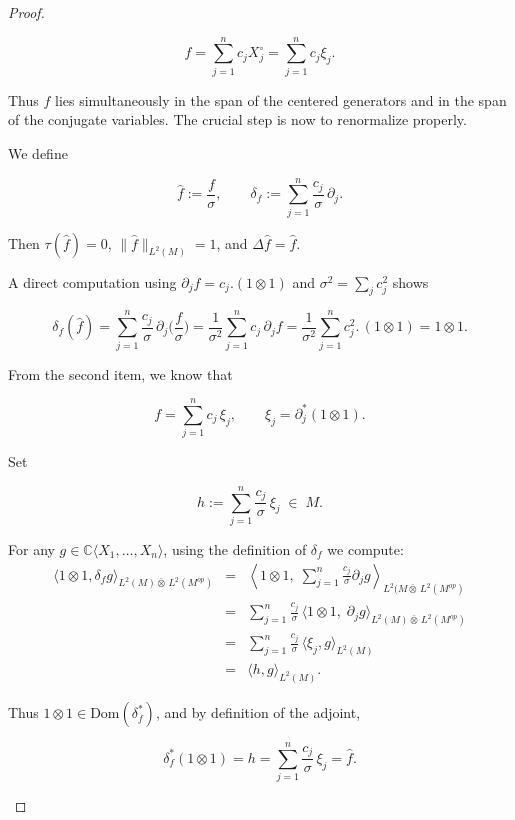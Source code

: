 \documentclass[10pt,a4paper,reqno]{amsart}
\newcommand{\A}{\mathbb{C}\langle X_1,\dots,X_n\rangle}
\begin{document}
\begin{proof}
\begin{enumerate}
\[
      f=\sum_{j=1}^n c_j X_j^\circ=\sum_{j=1}^n c_j \xi_j.
  \]


  Thus $f$ lies simultaneously in the span of the centered generators and in the span of the conjugate variables.  
  The crucial step is now to renormalize properly.

  \medskip
  We define
  

\[
      \widehat{f}:=\frac{f}{\sigma},\qquad 
      \delta_f:=\sum_{j=1}^n \frac{c_j}{\sigma}\,\partial_j.
  \]


  Then $\tau(\widehat f)=0$, $\|\widehat f\|_{L^2(M)}=1$, and $\Delta\widehat f=\widehat f$.

  A direct computation using $\partial_j f = c_j.(1\otimes 1)$ and $\sigma^2=\sum_j c_j^2$ shows
  

\[
      \delta_f(\widehat{f})
      =
      \sum_{j=1}^n \frac{c_j}{\sigma}\,\partial_j\Big(\frac{f}{\sigma}\Big)
      =
      \frac{1}{\sigma^2}\sum_{j=1}^n c_j\,\partial_j f
      =
      \frac{1}{\sigma^2}\sum_{j=1}^n c_j^2.\,(1\otimes 1)
      =
      1\otimes 1.
  \]



  \medskip
  From the second item, we know that
  

\[
      f=\sum_{j=1}^n c_j\,\xi_j,
      \qquad 
      \xi_j=\partial_j^\ast(1\otimes 1).
  \]


  Set
  

\[
      h:=\sum_{j=1}^n \frac{c_j}{\sigma}\,\xi_j \;\in\; M.
  \]



  For any $g\in\A$, using the definition of $\delta_f$ we compute:
  \begin{eqnarray*}
      \big\langle 1\otimes 1,\delta_f g\big\rangle_{L^2(M)\bar\otimes\,L^2(M^{op})}
      &=& \left\langle 1\otimes 1,\;
         \sum_{j=1}^n \frac{c_j}{\sigma}\partial_j g
         \right\rangle_{L^2(M\bar\otimes\,L^2(M^{op})} \\
      &=& \sum_{j=1}^n \frac{c_j}{\sigma}\,
         \big\langle 1\otimes 1,\;\partial_j g\big\rangle_{L^2(M)\bar\otimes\,L^2(M^{op})} \\
      &=& \sum_{j=1}^n \frac{c_j}{\sigma}\,
         \big\langle \xi_j,g\big\rangle_{L^2(M)} \\
      &=& \big\langle h,g\big\rangle_{L^2(M)}.
  \end{eqnarray*}

  Thus $1\otimes 1\in\mathrm{Dom}(\delta_f^\ast)$, and by definition of the adjoint,
  

\[
      \delta_f^\ast(1\otimes 1)=h
      =\sum_{j=1}^n \frac{c_j}{\sigma}\,\xi_j
      =\widehat{f}.
  \]




\end{enumerate}
\end{proof}
\end{document}
